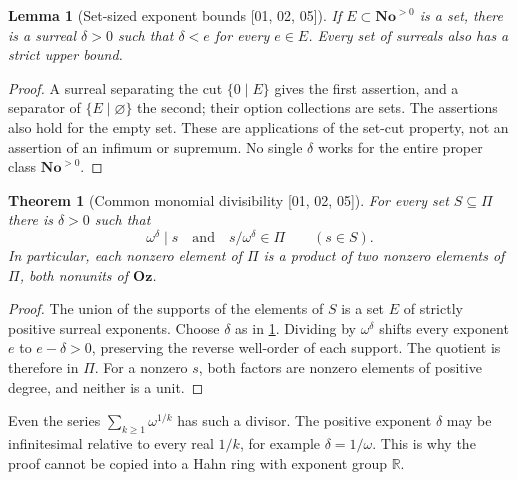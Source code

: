 \documentclass[11pt,oneside]{article}
\numberwithin{equation}{section}
\newtheorem{theorem}{Theorem}[section]
\newtheorem{lemma}[lemma]{Lemma}
\theoremstyle{definition}
\theoremstyle{remark}
\newcommand{\No}{\mathbf{No}}
\newcommand{\Oz}{\mathbf{Oz}}
\newcommand{\R}{\mathbb R}
\newcommand{\src}[1]{\textup{\textsf{\small[#1]}}}
\begin{document}
\begin{lemma}[Set-sized exponent bounds \src{01, 02, 05}]\label{odg:lem:setbounds}
If $E\subset\No^{>0}$ is a set, there is a surreal $\delta>0$ such
that $\delta<e$ for every $e\in E$. Every set of surreals also has a
strict upper bound.
\end{lemma}
\begin{proof}
A surreal separating the cut $\{0\mid E\}$ gives the first assertion, and
a separator of $\{E\mid\varnothing\}$ the second; their option collections
are sets. The assertions also hold for the empty set. These are applications
of the set-cut property, not an assertion of an infimum or supremum. No
single $\delta$ works for the entire proper class $\No^{>0}$.
\end{proof}

\begin{theorem}[Common monomial divisibility \src{01, 02, 05}]\label{odg:thm:commondivisor}
For every set $S\subseteq\Pi$ there is $\delta>0$ such that
\[
 \omega^\delta\mid s\quad\text{and}\quad
 s/\omega^\delta\in\Pi\qquad(s\in S).
\]
In particular, each nonzero element of $\Pi$ is a product of two nonzero
elements of $\Pi$, both nonunits of $\Oz$.
\end{theorem}
\begin{proof}
The union of the supports of the elements of $S$ is a set $E$ of strictly
positive surreal exponents. Choose $\delta$ as in
\cref{odg:lem:setbounds}. Dividing by $\omega^\delta$ shifts every exponent
$e$ to $e-\delta>0$, preserving the reverse well-order of each support.
The quotient is therefore in $\Pi$. For a nonzero $s$, both factors are
nonzero elements of positive degree, and neither is a unit.
\end{proof}

Even the series $\sum_{k\geq1}\omega^{1/k}$ has such a divisor. The
positive exponent $\delta$ may be infinitesimal relative to every real
$1/k$, for example $\delta=1/\omega$. This is why the proof cannot be copied
into a Hahn ring with exponent group $\R$.
\end{document}
